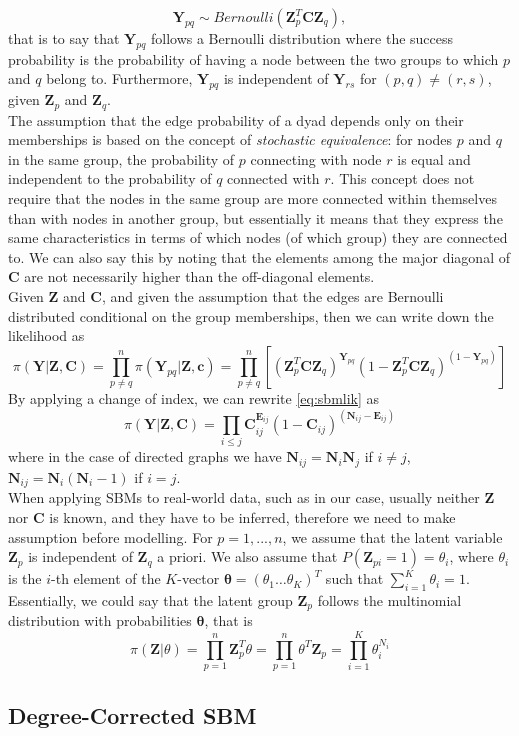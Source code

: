 \[
    \mathbf{Y}_{pq} \sim Bernoulli(\mathbf{Z}^T_p \mathbf{C} \mathbf{Z}_q),
\]
that is to say that $\mathbf{Y}_{pq}$ follows a Bernoulli distribution where the success probability is the probability of having a node between the two groups to which $p$ and $q$ belong to. Furthermore, $\mathbf{Y}_{pq}$ is independent of $\mathbf{Y}_{rs}$ for $(p,q) \neq (r,s)$, given $\mathbf{Z}_p$ and $\mathbf{Z}_q$.\\
The assumption that the edge probability of a dyad depends only on their memberships is based on the concept of \textit{stochastic equivalence}: for nodes $p$ and $q$ in the same group, the probability of $p$ connecting with node $r$ is equal and independent to the probability of $q$ connected with $r$. This concept does not require that the nodes in the same group are more connected within themselves than with nodes in another group, but essentially it means that they express the same characteristics in terms of which nodes (of which group) they are connected to. We can also say this by noting that the elements among the major diagonal of $\mathbf{C}$ are not necessarily higher than the off-diagonal elements.\\
Given $\mathbf{Z}$ and $\mathbf{C}$, and given the assumption that the edges are Bernoulli distributed conditional on the group memberships, then we can write down the likelihood as 
\begin{equation}\label{eq:sbmlik}
    \pi (\mathbf{Y}|\mathbf{Z},\mathbf{C}) = \prod_{p\neq q}^n \pi(\mathbf{Y}_{pq}|\mathbf{Z},\mathbf{c}) 
    = \prod_{p\neq q}^n \left[ \left( \mathbf{Z}^T_p \mathbf{C} \mathbf{Z}_q \right)^{\mathbf{Y}_{pq}} \left( 1 - \mathbf{Z}^T_p \mathbf{C} \mathbf{Z}_q \right)^{(1-\mathbf{Y}_{pq})} \right]
\end{equation}
By applying a change of index, we can rewrite \ref{eq:sbmlik} as
\begin{equation}
    \pi (\mathbf{Y}|\mathbf{Z},\mathbf{C}) = \prod_{i \leq j} \mathbf{C}^{\mathbf{E}_{ij}}_{ij} (1 - \mathbf{C}_{ij})^{(\mathbf{N}_{ij} - \mathbf{E}_{ij})}
\end{equation}
where in the case of directed graphs we have $\mathbf{N}_{ij} = \mathbf{N}_i\mathbf{N}_j$ if $i \neq j$, $\mathbf{N}_{ij} = \mathbf{N}_i(\mathbf{N}_i-1)$ if $i=j$.\\
When applying SBMs to real-world data, such as in our case, usually neither $\mathbf{Z}$ nor $\mathbf{C}$ is known, and they have to be inferred, therefore we need to make assumption before modelling. For $p = 1,...,n$, we assume that the latent variable $\mathbf{Z}_p$ is independent of $\mathbf{Z}_q$ a priori. We also assume that $P(\mathbf{Z}_{pi}=1) = \theta_i$, where $\theta_i$ is the $i$-th element of the $K$-vector $\mathbf{\theta} = (\theta_1 \dots \theta_K)^T$ such that $\sum_{i=1}^K \theta_i = 1$. Essentially, we could say that the latent group $\mathbf{Z}_p$ follows the multinomial distribution with probabilities $\mathbf{\theta}$, that is
\begin{equation}
    \pi(\mathbf{Z}|\theta) = \prod_{p=1}^n \mathbf{Z}_p^T \theta = \prod_{p=1}^n \theta^T \mathbf{Z}_p = \prod_{i=1}^K \theta^{N_i}_i
\end{equation}

\subsection{Degree-Corrected SBM}
